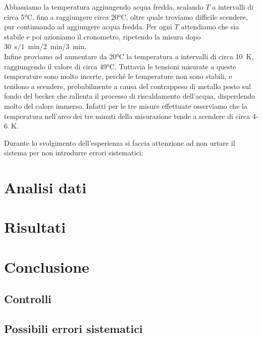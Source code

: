 \documentclass[italian, a4paper, 10pt, twocolumn]{../../style/lab_unige}
\begin{document}
    
    
    Abbassiamo la temperatura aggiungendo acqua fredda, scalando $T$ a intervalli di circa 5°C, fino a raggiungere circa 20°C, oltre quale troviamo difficile scendere, pur continuando ad aggiungere acqua fredda. Per ogni $T$ attendiamo che sia stabile e poi azioniamo il cronometro, ripetendo la misura dopo 30~s/1~min/2~min/3~min.\\
    Infine proviamo ad aumentare da 20°C la temperatura a intervalli di circa 10~K, raggiungendo il valore di circa 49°C. Tuttavia le tensioni misurate a queste temperature sono molto incerte, perché le temperature non sono stabili, e tendono a scendere, probabilmente a causa del contrappeso di metallo posto sul fondo del becker che rallenta il processo di riscaldamento dell'acqua, disperdendo molto del calore immerso. Infatti per le tre misure effettuate osserviamo che la temperatura nell'arco dei tre minuti della misurazione tende a scendere di circa 4-6~K.

    Durante lo svolgimento dell’esperienza si faccia attenzione ad non urtare il sistema per non introdurre errori sistematici.

    \section{Analisi dati}
    \label{section:analysis}

    \section{Risultati}
    \label{section:results}

    \section{Conclusione}
    \label{section:conclusion}

    \subsection{Controlli}

    \subsection{Possibili errori sistematici}



    
\end{document}
